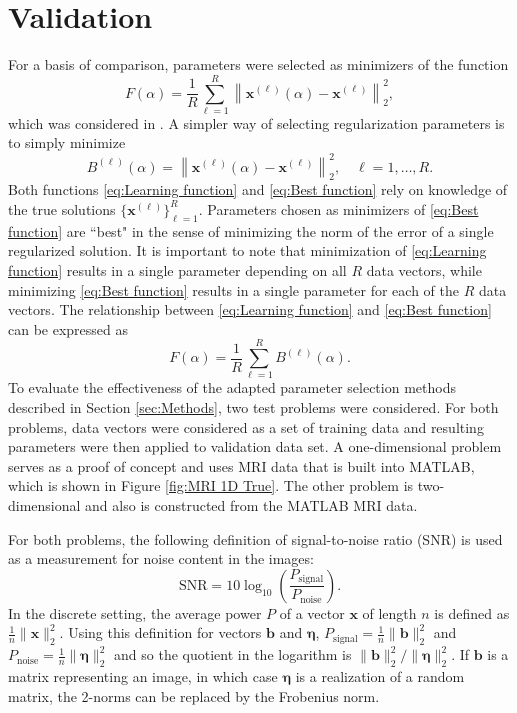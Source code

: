\documentclass[12pt]{article}
\newcommand{\bVec}{\mathbf{b}}	%
\newcommand{\xVec}{\mathbf{x}}	%
\newcommand{\regparam}{\alpha}
\newcommand{\noise}{\eta}	%
\newcommand{\noiseVec}{\bm{\noise}}	%
\begin{document}
\section{Validation} \label{sec:Validation}
For a basis of comparison, parameters were selected as minimizers of the function
\begin{equation}
\label{eq:Learning function}
F(\regparam) = \frac{1}{R}\sum_{\ell=1}^R \left\|\xVec^{(\ell)}(\regparam) - \xVec^{(\ell)}\right\|_2^2,
\end{equation} 
which was considered in \cite{ChungEspanol2017}. A simpler way of selecting regularization parameters is to simply minimize
\begin{equation}
\label{eq:Best function}
B^{(\ell)}(\regparam) = \left\|\xVec^{(\ell)}(\regparam) - \xVec^{(\ell)}\right\|_2^2, \quad \ell = 1,\ldots,R.
\end{equation}
Both functions \eqref{eq:Learning function} and \eqref{eq:Best function} rely on knowledge of the true solutions $\{\xVec^{(\ell)}\}_{\ell=1}^R$. Parameters chosen as minimizers of \eqref{eq:Best function} are ``best" in the sense of minimizing the norm of the error of a single regularized solution. It is important to note that minimization of \eqref{eq:Learning function} results in a single parameter depending on all $R$ data vectors, while minimizing \eqref{eq:Best function} results in a single parameter for each of the $R$ data vectors. The relationship between \eqref{eq:Learning function} and \eqref{eq:Best function} can be expressed as
\[F(\regparam) = \frac{1}{R}\sum_{\ell=1}^R B^{(\ell)}(\regparam).\]
\indent To evaluate the effectiveness of the adapted parameter selection methods described in Section \ref{sec:Methods}, two test problems were considered. For both problems, data vectors were considered as a set of training data and resulting parameters were then applied to validation data set. A one-dimensional problem serves as a proof of concept and uses MRI data that is built into MATLAB, which is shown in Figure \ref{fig:MRI 1D True}. The other problem is two-dimensional and also is constructed from the MATLAB MRI data. \par
For both problems, the following definition of signal-to-noise ratio (SNR) is used as a measurement for noise content in the images:
\begin{equation}
\label{eq:SNR}
\text{SNR} = 10\log_{10}\left(\frac{P_{\text{signal}}}{P_{\text{noise}}}\right).
\end{equation}
In the discrete setting, the average power $P$ of a vector $\xVec$ of length $n$ is defined as $\frac{1}{n}\|\xVec\|^2_2$. Using this definition for vectors $\bVec$ and $\noiseVec$, $P_{\text{signal}} = \frac{1}{n}\|\bVec\|^2_2$ and $P_{\text{noise}} = \frac{1}{n}\|\noiseVec\|^2_2$ and so the quotient in the logarithm is $\|\bVec\|_2^2/\|\noiseVec\|_2^2$. If $\bVec$ is a matrix representing an image, in which case $\noiseVec$ is a realization of a random matrix, the 2-norms can be replaced by the Frobenius norm.
\end{document}
